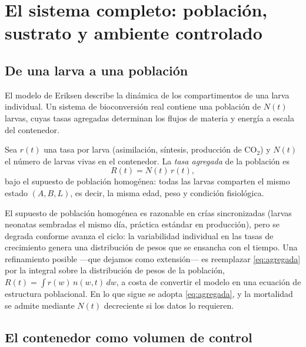 \section{El sistema completo: población, sustrato y ambiente controlado}

\subsection{De una larva a una población}

El modelo de Eriksen describe la dinámica de los compartimentos de una larva
individual. Un sistema de bioconversión real contiene una población de
$N(t)$ larvas, cuyas tasas agregadas determinan los flujos de materia y
energía a escala del contenedor.

\begin{definition}\label{def31}
Sea $r(t)$ una tasa por larva (asimilación, síntesis, producción de CO$_2$)
y $N(t)$ el número de larvas vivas en el contenedor. La \emph{tasa agregada}
de la población es
\begin{equation}
R(t) = N(t)\,r(t),
\label{eq:agregada}
\end{equation}
bajo el supuesto de población homogénea: todas las larvas comparten el mismo
estado $(A, B, L)$, es decir, la misma edad, peso y condición fisiológica.
\end{definition}

\begin{remark}\label{rem:homogeneidad}
El supuesto de población homogénea es razonable en crías sincronizadas
(larvas neonatas sembradas el mismo día, práctica estándar en producción),
pero se degrada conforme avanza el ciclo: la variabilidad individual en las
tasas de crecimiento genera una distribución de pesos que se ensancha con el
tiempo. Una refinamiento posible ---que dejamos como extensión--- es
reemplazar \eqref{eq:agregada} por la integral sobre la distribución de
pesos de la población, $R(t) = \int r(w)\,n(w,t)\,dw$, a costa de convertir
el modelo en una ecuación de estructura poblacional. En lo que sigue se
adopta \eqref{eq:agregada}, y la mortalidad se admite mediante $N(t)$
decreciente si los datos lo requieren.
\end{remark}

\subsection{El contenedor como volumen de control}

